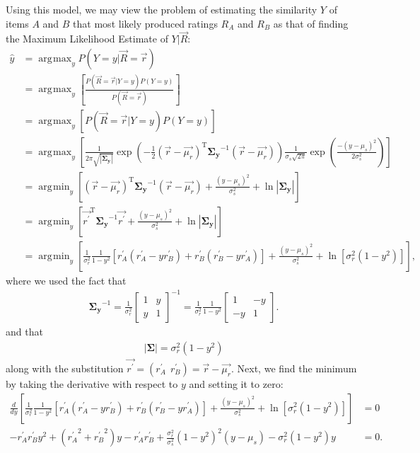 \documentclass[11pt]{article}
\DeclareMathOperator*{\argmax}{arg\!\max}
\DeclareMathOperator*{\argmin}{arg\!\min}
\begin{document}
Using this model, we may view the problem of estimating the similarity $Y$ of
items $A$ and $B$ that most likely produced ratings $R_A$ and $R_B$ as
that of finding the Maximum Likelihood Estimate of $Y | \vec{R}$:
\begin{align}
\hat{y} &= \argmax_yP(Y=y|\vec{R}=\vec{r}) 
\\&= \argmax_y\left[\frac{P(\vec{R}=\vec{r} |
Y=y)P(Y=y)}{P(\vec{R}=\vec{r})}\right]
\\&= \argmax_y\left[P(\vec{R}=\vec{r}|Y=y)P(Y=y)\right]
\\&=
\argmax_y\left[\frac{1}{2\pi\sqrt{\left|\mathbf{\Sigma_y}\right|}}\exp{\left(-\frac{1}{2}
(\vec{r} - \vec{\mu_r})^\mathrm{T}\mathbf{\Sigma_y}^{-1}(\vec{r} - \vec{\mu_r})\right)}
\frac{1}{\sigma_{s}\sqrt{2\pi}}\exp{\left(\frac{-(y-\mu_s)^2}
{2\sigma_{s}^2}\right)}\right]
\\&= \argmin_y\left[(\vec{r} -
\vec{\mu_r})^\mathrm{T}\mathbf{\Sigma_y}^{-1}(\vec{r} - \vec{\mu_r}) + \frac{(y -
\mu_s)^2}{\sigma_{s}^2} + \ln{\left|\mathbf{\Sigma_y}\right|} \right]
\\&=
\argmin_y\left[\vec{r^\prime}^\mathrm{T}\mathbf{\Sigma_y}^{-1}\vec{r^\prime}
 + \frac{(y - \mu_s)^2}{\sigma_{s}^2} + \ln{\left|\mathbf{\Sigma_y}\right|} \right]
\\&= \argmin_y\left[\frac{1}{\sigma_r^2}\frac{1}{1 -
y^2}\left[r_A^\prime(r_A^\prime - yr_B^\prime) + r_B^\prime(r_B^\prime -
yr_A^\prime)\right] + \frac{(y - \mu_s)^2}{\sigma_{s}^2} +
\ln{\left[\sigma_r^2(1 - y^2)\right]} \right],
\end{align}
where we used the fact that
\begin{align}
\mathbf{\Sigma_y}^{-1} = \frac{1}{\sigma_r^2}
\left[ \begin{array}{cc}  1 & y \\ y & 1 \end{array} \right]^{-1} =
\frac{1}{\sigma_r^2}\frac{1}{1 - y^2}\left[ \begin{array}{cc}  1 & -y \\ -y & 1
\end{array} \right].
\end{align}
and that
\begin{align}
\left|\mathbf{\Sigma}\right| = \sigma_r^2(1 - y^2)
\end{align}
along with the substitution $\vec{r^\prime} = (r_A^\prime~~r_B^\prime) = \vec{r}
- \vec{\mu_r}$. Next, we find the minimum by taking the derivative with respect
to $y$ and setting it to zero:
\begin{align}
\frac{d}{dy}\left[ \frac{1}{\sigma_r^2}\frac{1}{1 -
y^2}\left[r_A^\prime(r_A^\prime - yr_B^\prime) + r_B^\prime(r_B^\prime -
yr_A^\prime)\right] + \frac{(y - \mu_s)^2}{\sigma_{s}^2} +
\ln{\left[\sigma_r^2(1 - y^2)\right]} \right] &= 0 \\
-r_A^\prime r_B^\prime y^2 + ({r_A^\prime}^2 + {r_B^\prime}^2)y - r_A^\prime
r_B^\prime + \frac{\sigma_r^2}{\sigma_s^2}(1 - y^2)^2(y - \mu_s) - \sigma_r^2(1
- y^2)y &= 0.
\end{align}
\end{document}
